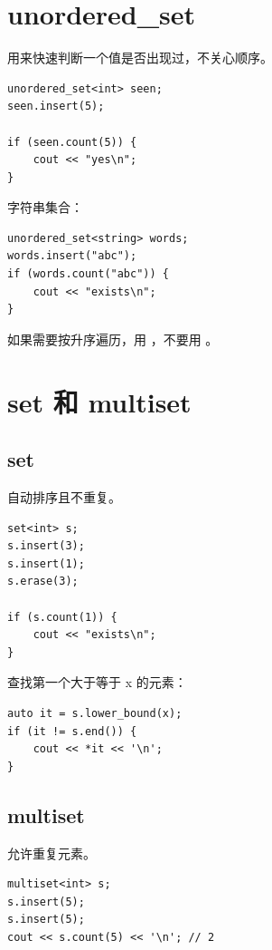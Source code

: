 \section{unordered\_set}\label{sec:04-18}

 用来快速判断一个值是否出现过，不关心顺序。

\begin{lstlisting}
unordered_set<int> seen;
seen.insert(5);

if (seen.count(5)) {
    cout << "yes\n";
}
\end{lstlisting}

字符串集合：

\begin{lstlisting}
unordered_set<string> words;
words.insert("abc");
if (words.count("abc")) {
    cout << "exists\n";
}
\end{lstlisting}

如果需要按升序遍历，用 ，不要用 。

\section{set 和 multiset}\label{sec:04-19}

\subsection{set}

 自动排序且不重复。

\begin{lstlisting}
set<int> s;
s.insert(3);
s.insert(1);
s.erase(3);

if (s.count(1)) {
    cout << "exists\n";
}
\end{lstlisting}

查找第一个大于等于 x 的元素：

\begin{lstlisting}
auto it = s.lower_bound(x);
if (it != s.end()) {
    cout << *it << '\n';
}
\end{lstlisting}

\subsection{multiset}

 允许重复元素。

\begin{lstlisting}
multiset<int> s;
s.insert(5);
s.insert(5);
cout << s.count(5) << '\n'; // 2
\end{lstlisting}

